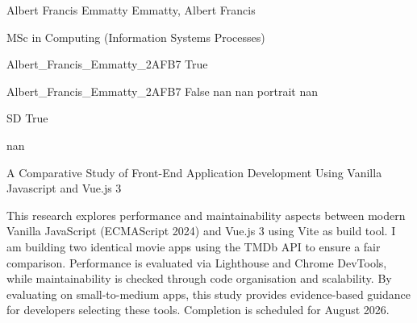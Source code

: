 \documentclass[twoside]{report}
\begin{document}
\begingroup{}\relax



\def\Key{Albert_Francis_Emmatty_2AFB7}

{Albert Francis Emmatty}
{Emmatty, Albert Francis}

{MSc in Computing (Information Systems Processes)}

{Albert_Francis_Emmatty_2AFB7}
{True}

{Albert_Francis_Emmatty_2AFB7}
{False}
{nan}
{nan}
{portrait}
{nan}

{SD}
{True}

{nan}

{A Comparative Study of Front-End Application Development Using Vanilla Javascript and Vue.js 3}

{This research explores performance and maintainability aspects between modern Vanilla JavaScript (ECMAScript 2024) and Vue.js 3 using Vite as build tool. I am building two identical movie apps using the TMDb API to ensure a fair comparison. Performance is evaluated via Lighthouse and Chrome DevTools, while maintainability is checked through code organisation and scalability. By evaluating on small-to-medium apps, this study provides evidence-based guidance for developers selecting these tools. Completion is scheduled for August 2026.}
\end{document}
